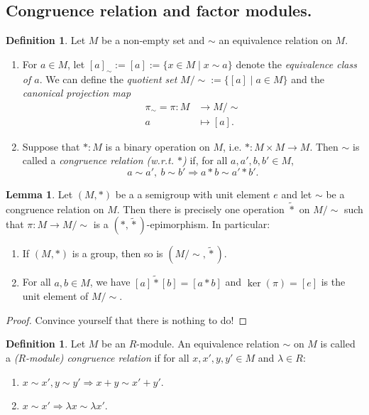 \documentclass[12pt,a4paper]{report}
\theoremstyle{definition}
\newtheorem{lemma}[theorem]{Lemma}
\newtheorem{defn}[theorem]{Definition}
\theoremstyle{num.custom-title}
\DeclareMathOperator{\imp}{\Rightarrow}
\begin{document}
\subsection{Congruence relation and factor modules.}

\begin{defn}
Let $M$ be a non-empty set and $\sim$ an equivalence relation on $M$.
\begin{enumerate}
\item For $a \in M$, let $[a]_\sim := [a] := \{x \in M \mid x \sim a\}$ denote the \emph{equivalence class of $a$}. We can define the \emph{quotient set} $M/{\sim} := \{[a] \mid a \in M\}$ and the \emph{canonical projection map}
\begin{align*}
\pi_\sim = \pi : M &\to M/{\sim} \\
a &\mapsto [a].
\end{align*}
\item Suppose that $*: M$ is a binary operation on $M$, i.e. $*: M \times M \to M$. Then $\sim$ is called a \emph{congruence relation (w.r.t. $*$)} if, for all $a,a',b,b' \in M$,
\[
a \sim a', \ b \sim b' \imp a*b \sim a'*b'.
\]
\end{enumerate}
\end{defn}

\begin{lemma}\label{lemma_operation_on_factor}
Let $(M,*)$ be a a semigroup with unit element $e$ and let $\sim$ be a congruence relation on $M$. Then there is precisely one operation $\tilde{*}$ on $M/{\sim}$ such that $\pi : M \to M/{\sim}$ is a $(*,\tilde{*})$-epimorphism. In particular:
\begin{enumerate}
\item If $(M,*)$ is a group, then so is $(M/{\sim},\tilde{*})$.
\item For all $a,b \in M$, we have $[a] \tilde{*} [b] = [a*b]$ and $\ker(\pi) = [e]$ is the unit element of $M/{\sim}$.
\end{enumerate}
\begin{proof}
Convince yourself that there is nothing to do!
\end{proof}
\end{lemma}

\begin{defn}
Let $M$ be an $R$-module. An equivalence relation $\sim$ on $M$ is called a \emph{($R$-module) congruence relation} if for all $x,x',y,y' \in M$ and $\lambda \in R$:
\begin{enumerate}
\item $x \sim x', y \sim y' \imp x+y \sim x'+y'$.
\item $x \sim x' \imp \lambda x \sim \lambda x'$.
\end{enumerate}
\end{defn}
\end{document}
